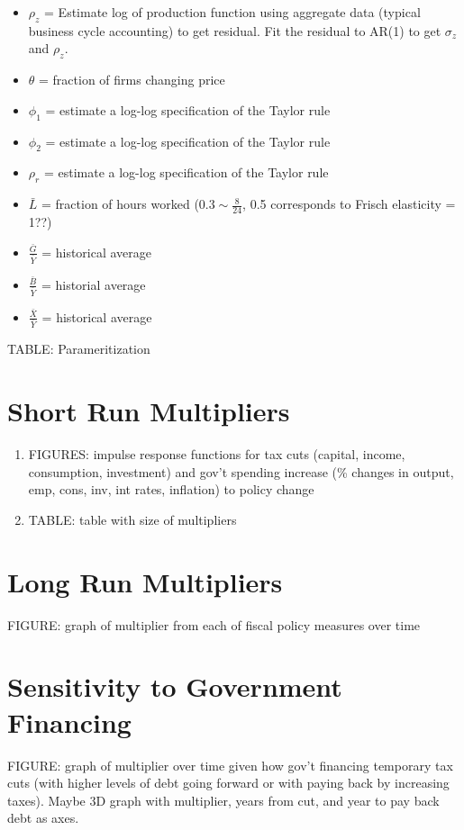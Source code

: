 \documentclass[article,11pt,letterpaper,fleqn]{article}
\theoremstyle{definition}
\numberwithin{equation}{section}
\begin{document}
{\begin{itemize}
\item $\rho_{z}$ = Estimate log of production function using aggregate data (typical business cycle accounting) to get residual.  Fit the residual to AR(1) to get $\sigma_{z}$ and $\rho_{z}$.
\item $\theta$ = fraction of firms changing price
\item $\phi_{1}$ = estimate a log-log specification of the Taylor rule
\item $\phi_{2}$ = estimate a log-log specification of the Taylor rule
\item $\rho_{r}$ = estimate a log-log specification of the Taylor rule
\item $\bar{L}$ = fraction of hours worked ($0.3 \sim \frac{8}{24}$, 0.5 corresponds to Frisch elasticity = 1??)
\item $\frac{\bar{G}}{\bar{Y}}$ = historical average
\item $\frac{\bar{B}}{\bar{Y}}$ = historial average
\item $\frac{\bar{X}}{\bar{Y}}$ = historical average
\end{itemize}

TABLE: Parameritization

\section{Short Run Multipliers}

\begin{enumerate}
\item FIGURES: impulse response functions for tax cuts (capital, income, consumption, investment) and gov't spending increase (\% changes in output, emp, cons, inv, int rates, inflation) to policy change
\item TABLE: table with size of multipliers
\end{enumerate}

\section{Long Run Multipliers}

FIGURE: graph of multiplier from each of fiscal policy measures over time

\section{Sensitivity to Government Financing}

FIGURE: graph of multiplier over time given how gov't financing temporary tax cuts (with higher levels of debt going forward or with paying back by increasing taxes).  Maybe 3D graph with multiplier, years from cut, and year to pay back debt as axes.

}
\end{document}

